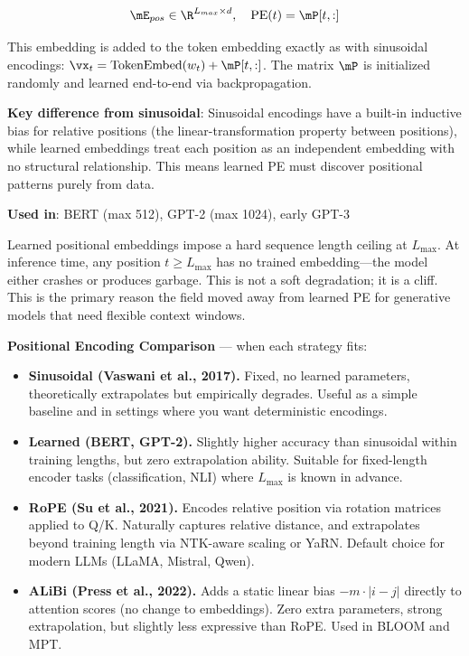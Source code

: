 \begin{equation}
\mE_{pos} \in \R^{L_{max} \times d}, \quad \text{PE}(t) = \mP[t, :]
\end{equation}

This embedding is added to the token embedding exactly as with sinusoidal encodings: $\vx_t = \text{TokenEmbed}(w_t) + \mP[t, :]$. The matrix $\mP$ is initialized randomly and learned end-to-end via backpropagation.

\textbf{Key difference from sinusoidal}: Sinusoidal encodings have a built-in inductive bias for relative positions (the linear-transformation property between positions), while learned embeddings treat each position as an independent embedding with no structural relationship. This means learned PE must discover positional patterns purely from data.

\textbf{Used in}: BERT (max 512), GPT-2 (max 1024), early GPT-3

\begin{warningbox}
Learned positional embeddings impose a hard sequence length ceiling at $L_{\max}$. At inference time, any position $t \geq L_{\max}$ has no trained embedding---the model either crashes or produces garbage. This is not a soft degradation; it is a cliff. This is the primary reason the field moved away from learned PE for generative models that need flexible context windows.
\end{warningbox}

\textbf{Positional Encoding Comparison} --- when each strategy fits:

\begin{itemize}
    \item \textbf{Sinusoidal (Vaswani et al., 2017).} Fixed, no learned parameters, theoretically extrapolates but empirically degrades. Useful as a simple baseline and in settings where you want deterministic encodings.
    \item \textbf{Learned (BERT, GPT-2).} Slightly higher accuracy than sinusoidal within training lengths, but zero extrapolation ability. Suitable for fixed-length encoder tasks (classification, NLI) where $L_{\max}$ is known in advance.
    \item \textbf{RoPE (Su et al., 2021).} Encodes relative position via rotation matrices applied to Q/K. Naturally captures relative distance, and extrapolates beyond training length via NTK-aware scaling or YaRN. Default choice for modern LLMs (LLaMA, Mistral, Qwen).
    \item \textbf{ALiBi (Press et al., 2022).} Adds a static linear bias $-m \cdot |i - j|$ directly to attention scores (no change to embeddings). Zero extra parameters, strong extrapolation, but slightly less expressive than RoPE. Used in BLOOM and MPT.
\end{itemize}

